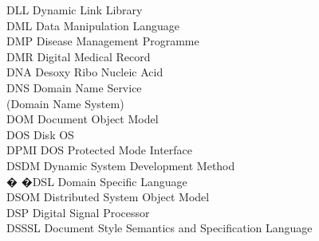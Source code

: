 \begin{tabbing}
    \>DLL \>\>Dynamic Link Library\\

    \>DML \>\>Data Manipulation Language\\

    \>DMP \>\>Disease Management Programme\\

    \>DMR \>\>Digital Medical Record\\

    \>DNA \>\>Desoxy Ribo Nucleic Acid\\



    \>DNS \>\>Domain Name Service\\
        \>\>\>(Domain Name System)\\

    \>DOM \>\>Document Object Model\\

    \>DOS \>\>Disk OS\\

    \>DPMI \>\>DOS Protected Mode Interface\\


    \>DSDM \>\>Dynamic System Development Method\\




 � �\>DSL \>\>Domain Specific Language\\

    \>DSOM \>\>Distributed System Object Model\\

    \>DSP \>\>Digital Signal Processor\\

    \>DSSSL \>\>Document Style Semantics and Specification Language\\



\end{tabbing}
